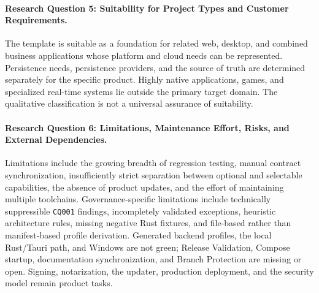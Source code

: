 \paragraph{Research Question 5: Suitability for Project Types and Customer Requirements.}
The template is suitable as a foundation for related web, desktop, and
combined business applications whose platform and cloud needs can be
represented. Persistence needs, persistence providers, and the source of truth
are determined separately for the specific product. Highly native
applications, games, and specialized real-time systems lie outside the primary
target domain. The qualitative classification is not a universal assurance of
suitability.

\paragraph{Research Question 6: Limitations, Maintenance Effort, Risks, and External Dependencies.}
Limitations include the growing breadth of regression testing, manual contract
synchronization, insufficiently strict separation between optional and
selectable capabilities, the absence of product updates, and the effort of
maintaining multiple toolchains.
Governance-specific limitations include technically suppressible
\texttt{CQ001} findings, incompletely validated exceptions, heuristic
architecture rules, missing negative Rust fixtures, and file-based rather than
manifest-based profile derivation. Generated backend profiles, the local
Rust/Tauri path, and Windows are not green; Release Validation, Compose
startup, documentation synchronization, and Branch Protection are missing or
open.
Signing, notarization, the updater, production deployment, and the security
model remain product tasks.
